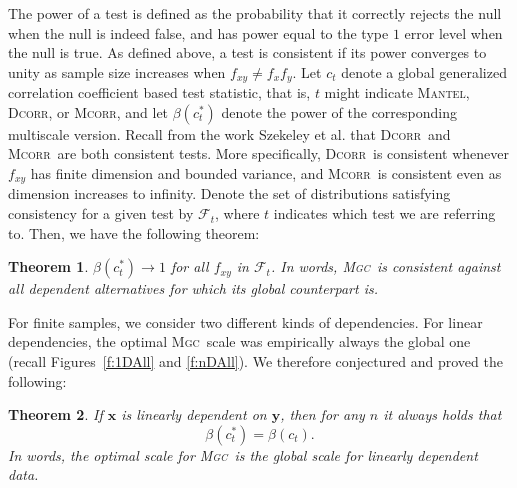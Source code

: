 \documentclass[11pt]{article}
\providecommand{\sct}[1]{{\normalfont\textsc{#1}}}
\providecommand{\mb}[1]{\boldsymbol{#1}}
\providecommand{\mc}[1]{\mathcal{#1}}
\newcommand{\G}{c}
\newcommand{\Mgc}{\sct{Mgc}}
\newcommand{\Dcorr}{\sct{Dcorr}}
\newcommand{\Mcorr}{\sct{Mcorr}}
\newcommand{\Mantel}{\sct{Mantel}}
\newtheorem{thm}{Theorem}
\begin{document}
The power of a test is defined as the probability that it correctly rejects the null when the null is indeed false, and has power equal to the type $1$ error level when the null is true.
As defined above, a test is consistent if its power converges to unity as sample size increases when $f_{xy} \neq f_x f_y$.
Let $\G_t$ denote a global generalized correlation coefficient based test statistic, that is, $t$ might indicate \Mantel, \Dcorr, or \Mcorr, and let $\beta(\G_t^*)$ denote the power of the corresponding multiscale version.
Recall from the work Szekeley et al. that \Dcorr~and \Mcorr~are both consistent tests. More specifically, \Dcorr~is consistent whenever $f_{xy}$ has finite dimension and bounded variance, and \Mcorr~is consistent even as dimension increases to infinity.  Denote the set of distributions satisfying consistency for a given test by $\mc{F}_t$, where $t$ indicates which test we are referring to. Then, we have the following theorem:
\begin{thm}
\label{thm1}
$\beta(\G_t^*) \rightarrow 1$ for all $f_{xy}$ in $\mc{F}_t$.
In words, \Mgc~is consistent against all dependent alternatives for which its global counterpart is. 
\end{thm}

% 
For finite samples, we consider two different kinds of dependencies.
For linear dependencies,  the optimal \Mgc~scale was empirically always the global one (recall Figures~\ref{f:1DAll} and \ref{f:nDAll}). We therefore conjectured and proved the following:
\begin{thm}
\label{t:linear}
If $\mb{x}$ is linearly dependent on $\mb{y}$, then for any $n$ it always holds that
\begin{equation}
\beta(\G^{*}_t) = \beta(\G_t).
\end{equation}
In words, the optimal scale for \Mgc~is the global scale for linearly dependent data.
\end{thm}
\end{document}
